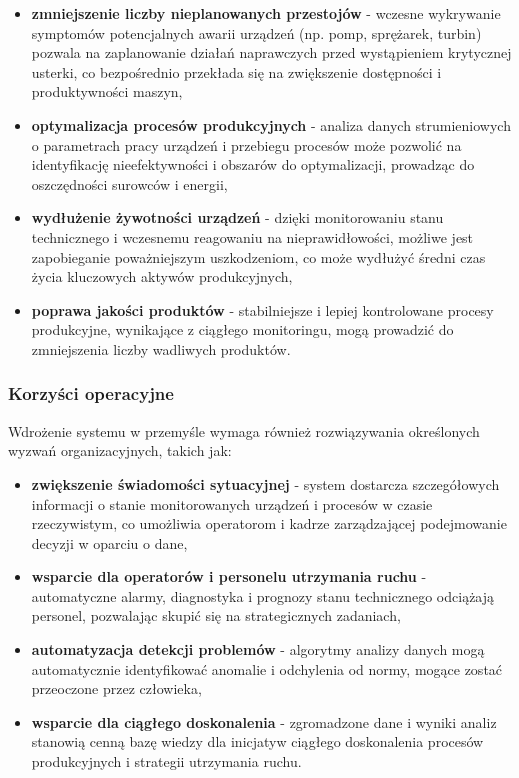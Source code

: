 \begin{itemize}
    \item \textbf{zmniejszenie liczby nieplanowanych przestojów} - wczesne wykrywanie symptomów potencjalnych awarii urządzeń (np. pomp, sprężarek, turbin) pozwala na zaplanowanie działań naprawczych przed wystąpieniem krytycznej usterki, co bezpośrednio przekłada się na zwiększenie dostępności i produktywności maszyn,
    \item \textbf{optymalizacja procesów produkcyjnych} - analiza danych strumieniowych o parametrach pracy urządzeń i przebiegu procesów może pozwolić na identyfikację nieefektywności i obszarów do optymalizacji, prowadząc do oszczędności surowców i energii,
    \item \textbf{wydłużenie żywotności urządzeń} - dzięki monitorowaniu stanu technicznego i wczesnemu reagowaniu na nieprawidłowości, możliwe jest zapobieganie poważniejszym uszkodzeniom, co może wydłużyć średni czas życia kluczowych aktywów produkcyjnych,
    \item \textbf{poprawa jakości produktów} - stabilniejsze i lepiej kontrolowane procesy produkcyjne, wynikające z ciągłego monitoringu, mogą prowadzić do zmniejszenia liczby wadliwych produktów.
\end{itemize}

\subsubsection{Korzyści operacyjne}
\label{subsubsec:korzysci_operacyjne}

Wdrożenie systemu w przemyśle wymaga również rozwiązywania określonych wyzwań organizacyjnych, takich jak:

\begin{itemize}
    \item \textbf{zwiększenie świadomości sytuacyjnej} - system dostarcza szczegółowych informacji o stanie monitorowanych urządzeń i procesów w czasie rzeczywistym, co umożliwia operatorom i kadrze zarządzającej podejmowanie decyzji w oparciu o dane,
    \item \textbf{wsparcie dla operatorów i personelu utrzymania ruchu} - automatyczne alarmy, diagnostyka i prognozy stanu technicznego odciążają personel, pozwalając skupić się na strategicznych zadaniach,
    \item \textbf{automatyzacja detekcji problemów} - algorytmy analizy danych mogą automatycznie identyfikować anomalie i odchylenia od normy, mogące zostać przeoczone przez człowieka,
    \item \textbf{wsparcie dla ciągłego doskonalenia} - zgromadzone dane i wyniki analiz stanowią cenną bazę wiedzy dla inicjatyw ciągłego doskonalenia procesów produkcyjnych i strategii utrzymania ruchu.
\end{itemize}

